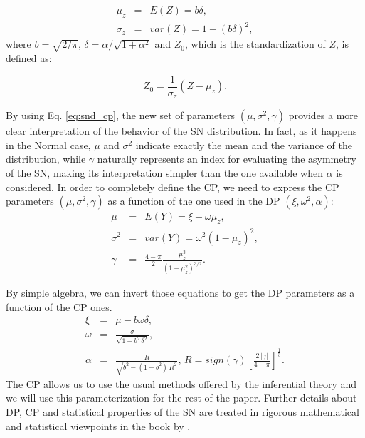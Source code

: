 \documentclass[11pt, oneside]{article}
\begin{document}
\begin{eqnarray}
\mu_{z} &=& E(Z) = b\delta, \nonumber\\
\sigma_{z} &=& var(Z) = 1-(b\delta)^2,\nonumber
\end{eqnarray}
where $b=\sqrt{2/\pi}$, $\delta = \alpha / \sqrt{1+\alpha^{2}}$ and $Z_{0}$, which is the standardization of $Z$, is defined as:
 
\begin{equation} \label{eq:snd_cp}
Z_{0}=\frac{1}{\sigma_{z}}\left(Z-\mu_{z}\right).
\end{equation}

By using Eq. \ref{eq:snd_cp}, the new set of parameters $(\mu, \sigma^2, \gamma)$ provides a more clear interpretation of the behavior of the SN distribution. In fact, as it happens in the Normal case, $\mu$ and $\sigma^2$ indicate exactly the mean and the variance of the distribution, while $\gamma$ naturally represents an index for evaluating the asymmetry of the SN, making its interpretation simpler than the one available when $\alpha$ is considered. In order to completely define the CP, we need to express the CP parameters $(\mu, \sigma^2, \gamma)$ as a function of the one used in the DP $(\xi, \omega^2, \alpha)$:
%
\begin{eqnarray} \label{eq:1}
\mu &=& E(Y) = \xi + \omega \mu_{z}, \\
\sigma^{2} &=& var(Y) = \omega^{2} (1-\mu_{z})^2, \nonumber\\
\gamma &=& \frac{4-\pi}{2} \frac{\mu_{z}^{3}}{\left(1-\mu_{z}^2\right)^{3/2}}. \nonumber
\end{eqnarray}

By simple algebra, we can invert those equations to get the DP parameters as a function of the CP ones.
%
\begin{eqnarray} \label{eq:2}
\xi &=& \mu - b\omega\delta, \\
\omega &=& \frac{\sigma}{\sqrt{1 - b^2\,\delta^2}}, \nonumber\\
\alpha &=& \frac{R}{\sqrt{b^2 - (1-b^2)\,R^2}},\,R = sign(\gamma) \left[\frac{2\,|\gamma|}{4-\pi}\right]^{\frac{1}{3}}. \nonumber
\end{eqnarray}
%
The CP allows us to use the usual methods offered by the inferential theory and we will use this parameterization for the rest of the paper. Further details about DP, CP and statistical properties of the SN are treated in rigorous mathematical and statistical viewpoints in the book by \cite{Azzalini2014}.

\end{document}
